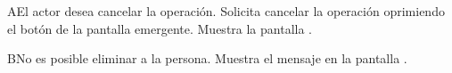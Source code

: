 		\begin{UCtrayectoriaA}{A}{El actor desea cancelar la operación.}
			\UCpaso[\UCactor] Solicita cancelar la operación oprimiendo el botón  de la pantalla emergente.
			\UCpaso[\UCsist] Muestra la pantalla .
		\end{UCtrayectoriaA}

		\begin{UCtrayectoriaA}{B}{No es posible eliminar a la persona.}
			\UCpaso[\UCsist] Muestra el mensaje  en la pantalla .
		\end{UCtrayectoriaA}
